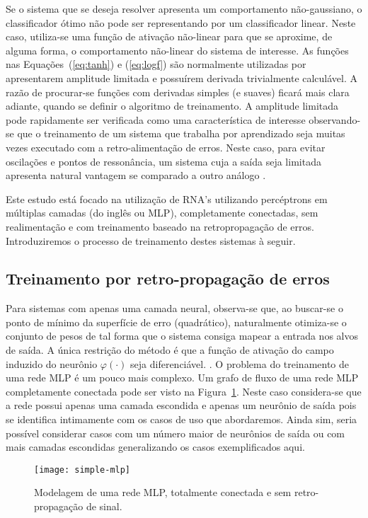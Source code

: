 Se o sistema que se deseja resolver apresenta um comportamento não-gaussiano,
o classificador ótimo não pode ser representando por um classificador
linear. Neste caso, utiliza-se uma função de ativação não-linear para que se
aproxime, de alguma forma, o comportamento não-linear do sistema de interesse.
As funções nas Equações~(\ref{eq:tanh}) e (\ref{eq:logf}) são normalmente
utilizadas por apresentarem amplitude limitada e possuírem derivada
trivialmente calculável. A razão de procurar-se funções com derivadas simples
(e suaves) ficará mais clara adiante, quando se definir o algoritmo de
treinamento. A amplitude limitada pode rapidamente ser verificada como uma
característica de interesse observando-se que o treinamento de um sistema que
trabalha por aprendizado seja muitas vezes executado com a retro-alimentação
de erros. Neste caso, para evitar oscilações e pontos de ressonância, um
sistema cuja a saída seja limitada apresenta natural vantagem se comparado a
outro análogo \cite{haykin}.

Este estudo está focado na utilização de RNA's utilizando percéptrons em
múltiplas camadas (do inglês  ou MLP),
completamente conectadas, sem realimentação e com treinamento baseado na
retropropagação de erros. Introduziremos o processo de treinamento destes
sistemas à seguir.

\subsection{Treinamento por retro-propagação de erros}

Para sistemas com apenas uma camada neural, observa-se que, ao buscar-se o
ponto de mínimo da superfície de erro (quadrático), naturalmente otimiza-se o
conjunto de pesos de tal forma que o sistema consiga mapear a entrada nos
alvos de saída. A única restrição do método é que a função de ativação do
campo induzido do neurônio $\varphi(\cdot)$ seja diferenciável.
\cite{rosenblatt}. O problema do treinamento de uma rede MLP é um pouco mais
complexo. Um grafo de fluxo de uma rede MLP completamente conectada pode ser
visto na Figura~\ref{fig:simple-mlp}. Neste caso considera-se que a rede
possui apenas uma camada escondida e apenas um neurônio de saída pois se
identifica intimamente com os casos de uso que abordaremos. Ainda sim, seria
possível considerar casos com um número maior de neurônios de saída ou com
mais camadas escondidas generalizando os casos exemplificados aqui.

\begin{figure}
\begin{center}
\texttt{[image: simple-mlp]}
\end{center}
\caption{Modelagem de uma rede MLP, totalmente conectada e sem
retro-propagação de sinal.}
\label{fig:simple-mlp}
\end{figure}

